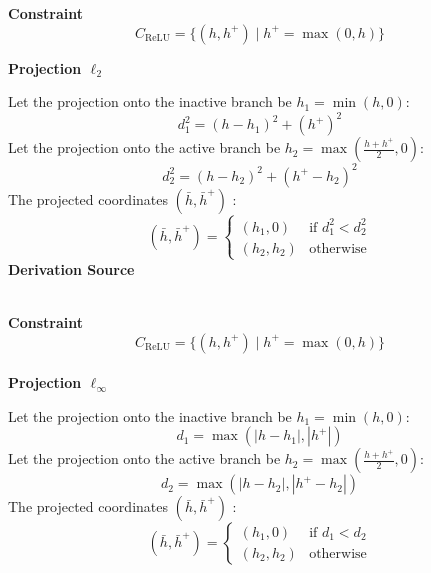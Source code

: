 \begin{tcolorbox}[projectioncard, title=ReLU Layer ($\ell_2$)]
 
\textbf{Constraint}
\[
C_{\mathrm{ReLU}} = \{(h, h^+) \mid h^+ = \max(0, h)\}
\]
 
\textbf{Projection $\ell_2$}
 
Let the projection onto the inactive branch be $h_1 = \min(h, 0)$:
\[
d_1^2 = (h - h_1)^2 + (h^+)^2
\]
Let the projection onto the active branch be $h_2 = \max\left(\frac{h + h^+}{2}, 0\right)$:
\[
d_2^2 = (h - h_2)^2 + (h^+ - h_2)^2
\]
The projected coordinates $(\bar{h}, \bar{h}^+)$ :
\[
(\bar{h}, \bar{h}^+) =
\begin{cases}
(h_1, 0) & \text{if } d_1^2 < d_2^2\\
(h_2, h_2) & \text{otherwise}
\end{cases}
\]
\textbf{Derivation Source}
\cite{ elser2019learning}\\
\end{tcolorbox}
\begin{tcolorbox}[projectioncard, title=ReLU Layer ($\ell_{\infty}$)]\\
\textbf{Constraint}
\[
C_{\mathrm{ReLU}} = \{(h, h^+) \mid h^+ = \max(0, h)\}
\]
\\
\textbf{Projection $\ell_\infty$}
 
 
Let the projection onto the inactive branch be $h_1 = \min(h, 0)$:
\[
d_1 = \max(|h - h_1|, |h^+|)
\]
Let the projection onto the active branch be $h_2 = \max\left(\frac{h + h^+}{2}, 0\right)$:
\[
d_2 = \max(|h - h_2|, |h^+ - h_2|)
\]
The projected coordinates $(\bar{h}, \bar{h}^+)$ :
\[
(\bar{h}, \bar{h}^+) =
\begin{cases}
(h_1, 0) & \text{if } d_1 < d_2 \\
(h_2, h_2) & \text{otherwise}
\end{cases}
\]
\end{tcolorbox}

